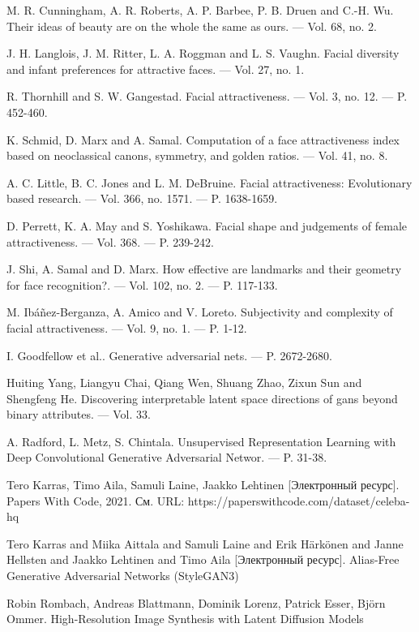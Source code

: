 \documentclass[60x84/16,8pt]{ittmm}
\begin{document}
\begin{thebibliography}{99}

M. R. Cunningham, A. R. Roberts, A. P. Barbee, P. B. Druen and C.-H. Wu.
Their ideas of beauty are on the whole the same as ours. 
--- Vol. 68, no. 2.

J. H. Langlois, J. M. Ritter, L. A. Roggman and L. S. Vaughn.
Facial diversity and infant preferences for attractive faces. 
--- Vol. 27, no. 1.

R. Thornhill and S. W. Gangestad.
Facial attractiveness. 
--- Vol. 3, no. 12. 
--- P. 452-460.

K. Schmid, D. Marx and A. Samal.
Computation of a face attractiveness index based on neoclassical canons, symmetry, and golden ratios. 
--- Vol. 41, no. 8.

A. C. Little, B. C. Jones and L. M. DeBruine.
Facial attractiveness: Evolutionary based research. 
--- Vol. 366, no. 1571.
--- P. 1638-1659.

D. Perrett, K. A. May and S. Yoshikawa.
Facial shape and judgements of female attractiveness.
--- Vol. 368.
--- P. 239-242.

J. Shi, A. Samal and D. Marx.
How effective are landmarks and their geometry for face recognition?. 
--- Vol. 102, no. 2.
--- P. 117-133.

M. Ibáñez-Berganza, A. Amico and V. Loreto.
Subjectivity and complexity of facial attractiveness. 
--- Vol. 9, no. 1.
--- P. 1-12.

I. Goodfellow et al..
Generative adversarial nets. 
--- P. 2672-2680.

Huiting Yang, Liangyu Chai, Qiang Wen, Shuang Zhao, Zixun Sun and Shengfeng He.
Discovering interpretable latent space directions of gans beyond binary attributes. 
--- Vol. 33.

A. Radford, L. Metz, S. Chintala.
Unsupervised Representation Learning with Deep Convolutional Generative Adversarial Networ. 
--- P. 31-38.

Tero Karras, Timo Aila, Samuli Laine, Jaakko Lehtinen [Электронный ресурс].
Papers With Code, 2021.
См. URL: https://paperswithcode.com/dataset/celeba-hq

Tero Karras and Miika Aittala and Samuli Laine and Erik H\"ark\"onen and Janne Hellsten and Jaakko Lehtinen and Timo Aila [Электронный ресурс].
Alias-Free Generative Adversarial Networks (StyleGAN3)

Robin Rombach, Andreas Blattmann, Dominik Lorenz, Patrick Esser, Björn Ommer.
High-Resolution Image Synthesis with Latent Diffusion Models

\end{thebibliography}


% 
% 

\makealttitle
\end{document}
